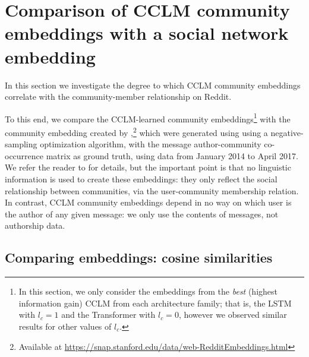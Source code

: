 \documentclass[11pt]{article}
\begin{document}
\section{Comparison of CCLM community embeddings with a social network embedding}\label{sec:embedding-analysis}



In this section we investigate the degree to which CCLM community
embeddings correlate with the community-member relationship on Reddit.

To this end, we compare the CCLM-learned community
embeddings\footnote{
  In this section, we only consider the embeddings from 
  the \emph{best} (highest information gain) CCLM from each architecture family; 
  that is, the LSTM with $l_c=1$ and the Transformer with $l_c=0$, however we
  observed similar results for other values of $l_c$.}
with the community embedding created by \citet{Kumar2018},\footnote{
  Available at \url{https://snap.stanford.edu/data/web-RedditEmbeddings.html}}
which were generated using using a negative-sampling optimization
algorithm, with the message author-community co-occurrence matrix as ground
truth, using data from January 2014 to April 2017.
We refer the reader
to \citet{Kumar2018}
for details, but the important point is that no linguistic
information is used to create these embeddings: they only reflect the social
relationship between communities, via 
the user-community membership relation. In contrast, CCLM community embeddings depend in no
way on which user is the author of any given message: we only use the
contents of messages, not authorship data.
%

\subsection{Comparing embeddings: cosine similarities}
\label{sec:storytelling}

\newcommand{\pairwisecossimbarplot}[1]{
    \nextgroupplot[ybar=0pt,
      bar width=0.25cm,
      xticklabels from table={floats/#1}{comms-label},
      enlargelimits=0.15,
      yticklabels={,,}
    ]
    \addplot[draw=violet,fill=violet!10] table [y=lstm-sim] {floats/#1};
    \addplot[draw=teal,fill=teal!10] table [y=transformer-sim] {floats/#1};
    \addplot[draw=red,fill=red!10] table [y=social-sim] {floats/#1};
}
\end{document}
